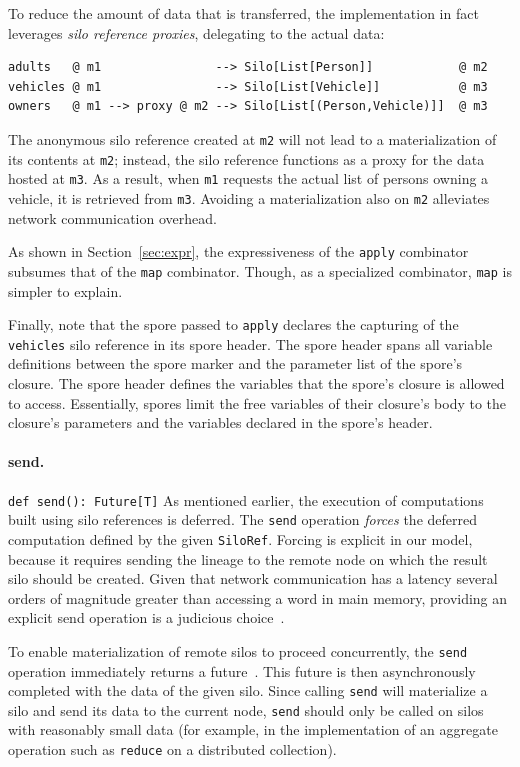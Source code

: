 \documentclass{jfp1}
\begin{document}
To reduce the amount of data that is transferred, the implementation in fact
leverages {\em silo reference proxies}, delegating to the actual data:

\begin{lstlisting}
adults   @ m1                --> Silo[List[Person]]            @ m2
vehicles @ m1                --> Silo[List[Vehicle]]           @ m3
owners   @ m1 --> proxy @ m2 --> Silo[List[(Person,Vehicle)]]  @ m3
\end{lstlisting}
\noindent
The anonymous silo reference created at \verb|m2| will not lead to a
materialization of its contents at \verb|m2|; instead, the silo
reference functions as a proxy for the data hosted at \verb|m3|.  As a
result, when \verb|m1| requests the actual list of persons owning a
vehicle, it is retrieved from \verb|m3|. Avoiding a materialization
also on \verb|m2| alleviates network communication overhead.

As shown in Section~\ref{sec:expr}, the expressiveness of the
\verb|apply| combinator subsumes that of the \verb|map|
combinator. Though, as a specialized combinator, \verb|map| is simpler
to explain.

Finally, note that the spore passed to \verb|apply| declares the
capturing of the \verb|vehicles| silo reference in its spore
header. The spore header spans all variable definitions between the
spore marker and the parameter list of the spore's closure. The spore
header defines the variables that the spore's closure is allowed to
access. Essentially, spores limit the free variables of their
closure's body to the closure's parameters and the variables declared
in the spore's header.

\paragraph{send.}%
%
\texttt{def send(): Future[T]} \newline
%
As mentioned earlier, the execution of computations built using silo references
is deferred. The \verb|send| operation {\em forces} the deferred computation
defined by the given \verb|SiloRef|. Forcing is explicit in our model, because it
requires sending the lineage to the remote node on which the result silo should
be created. Given that network communication has a latency several orders of
magnitude greater than accessing a word in main memory, providing an explicit
send operation is a judicious choice~\cite{ANoteDistComp}.

To enable materialization of remote silos to proceed concurrently, the
\verb|send| operation immediately returns a future~\cite{Futures}. This future
is then asynchronously completed with the data of the given silo. Since calling
\verb|send| will materialize a silo and send its data to the current node,
\verb|send| should only be called on silos with reasonably small data (for
example, in the implementation of an aggregate operation such as \verb|reduce|
on a distributed collection).
\end{document}

